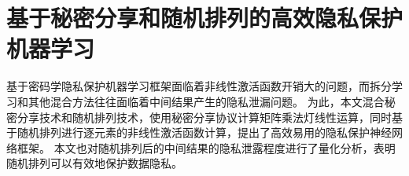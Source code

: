 \chapter{基于秘密分享和随机排列的高效隐私保护机器学习}
基于密码学隐私保护机器学习框架面临着非线性激活函数开销大的问题，而拆分学习和其他混合方法往往面临着中间结果产生的隐私泄漏问题。
%
为此，本文混合秘密分享技术和随机排列技术，使用秘密分享协议计算矩阵乘法灯线性运算，同时基于随机排列进行逐元素的非线性激活函数计算，提出了高效易用的隐私保护神经网络框架。
%
本文也对随机排列后的中间结果的隐私泄露程度进行了量化分析，表明随机排列可以有效地保护数据隐私。
%


\label{chap:ss-perm}





